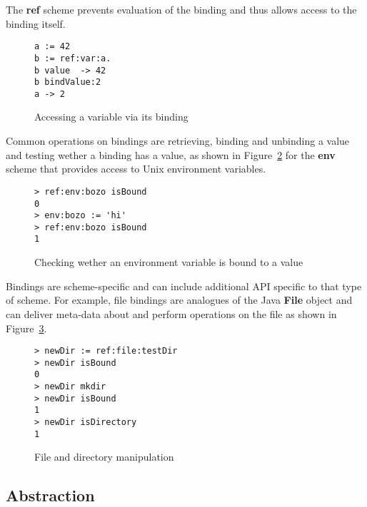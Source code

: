 \documentclass[preprint,authoryear]{acm_proc_article-sp}
\begin{document}
The {\bf ref} scheme prevents evaluation of the binding and thus allows access
to the binding itself.  

\begin{figure}[htbp]
\begin{center}
\begin{verbatim}
a := 42
b := ref:var:a.
b value  -> 42
b bindValue:2
a -> 2
\end{verbatim}
\caption{Accessing a variable via its binding}
\label{ref-binding}
\end{center}
\end{figure}

Common operations on bindings are retrieving, binding and unbinding a value and testing 
wether a binding has a value, as shown in Figure~\ref{isBound} for the {\bf env} scheme
that provides access to Unix environment variables.

\begin{figure}[htbp]
\begin{center}
\begin{verbatim}
> ref:env:bozo isBound
0
> env:bozo := 'hi'
> ref:env:bozo isBound
1
\end{verbatim}
\caption{Checking wether an environment variable is bound to a value}
\label{isBound}
\end{center}
\end{figure}


Bindings are scheme-specific and can include additional API specific to that type of scheme.
For example, file bindings are analogues of the Java {\bf File} object and can deliver
meta-data about and perform operations on the file as shown in Figure~\ref{ref-file-dir}.



\begin{figure}[htbp]
\begin{center}
\begin{verbatim}
> newDir := ref:file:testDir 
> newDir isBound 
0
> newDir mkdir 
> newDir isBound
1
> newDir isDirectory 
1
\end{verbatim}
\caption{File and directory manipulation}
\label{ref-file-dir}
\end{center}
\end{figure}




\subsection{Abstraction}
\end{document}
